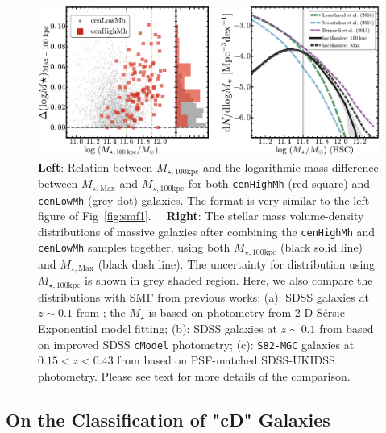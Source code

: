 \documentclass[a4paper,fleqn,usenatbib]{mnras}
\def\ser{{S\'{e}rsic\ }}
\def\rbcg{\texttt{cenHighMh}}
\def\nbcg{\texttt{cenLowMh}}
\def\mstar{{$M_{\star}$}}
\def\mtot{{$M_{\star,100\mathrm{kpc}}$}}
\def\mmax{{$M_{\star,\mathrm{Max}}$}}
\begin{document}
  \begin{figure}
      \centering 
      \includegraphics[width=\textwidth]{fig/redbcg_discussion_5}
      \caption{
          \textbf{Left}: Relation between \mtot{} and the logarithmic mass difference 
          between \mmax{} and \mtot{} for both \rbcg{} (red square) and \nbcg{} 
          (grey dot) galaxies.  The format is very similar to the left figure of 
          Fig~\ref{fig:smf1}.~~
          \textbf{Right}: The stellar mass volume-density distributions of massive galaxies 
          after combining the \rbcg{} and \nbcg{} samples together, using both 
          \mtot{} (black solid line) and \mmax{} (black dash line). 
          The uncertainty for distribution using \mtot{} is shown in grey shaded region.  
          Here, we also compare the distributions with SMF from previous works: 
          (a): SDSS galaxies at $z\sim 0.1$ from \citet{Bernardi2013}; the \mstar{} is 
          based on photometry from 2-D \ser{}$+$Exponential model fitting; 
          (b): SDSS galaxies at $z\sim 0.1$ from \citet{Moustakas13} based on 
          improved SDSS \texttt{cModel} photometry; 
          (c): \texttt{S82-MGC} galaxies at $0.15 < z< 0.43$ from 
          \citet{Leauthaud2016} based on PSF-matched SDSS-UKIDSS photometry.
          Please see text for more details of the comparison.
          }
      \label{fig:discussion_2}
  \end{figure}

    
\subsection{On the Classification of "cD" Galaxies}
        
\end{document}
